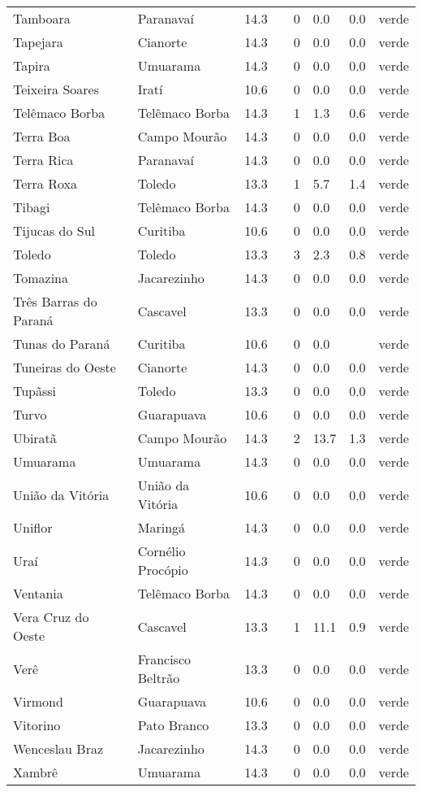 \begin{longtable}{l|lllllll}
  Tamboara & Paranavaí & 14.3 &  & 0 & 0.0 & 0.0 & verde \\ 
  Tapejara & Cianorte & 14.3 &  & 0 & 0.0 & 0.0 & verde \\ 
  Tapira & Umuarama & 14.3 &  & 0 & 0.0 & 0.0 & verde \\ 
  Teixeira Soares & Iratí & 10.6 &  & 0 & 0.0 & 0.0 & verde \\ 
  Telêmaco Borba & Telêmaco Borba & 14.3 &  & 1 & 1.3 & 0.6 & verde \\ 
  Terra Boa & Campo Mourão & 14.3 &  & 0 & 0.0 & 0.0 & verde \\ 
  Terra Rica & Paranavaí & 14.3 &  & 0 & 0.0 & 0.0 & verde \\ 
  Terra Roxa & Toledo & 13.3 &  & 1 & 5.7 & 1.4 & verde \\ 
  Tibagi & Telêmaco Borba & 14.3 &  & 0 & 0.0 & 0.0 & verde \\ 
  Tijucas do Sul & Curitiba & 10.6 &  & 0 & 0.0 & 0.0 & verde \\ 
  Toledo & Toledo & 13.3 &  & 3 & 2.3 & 0.8 & verde \\ 
  Tomazina & Jacarezinho & 14.3 &  & 0 & 0.0 & 0.0 & verde \\ 
  Três Barras do Paraná & Cascavel & 13.3 &  & 0 & 0.0 & 0.0 & verde \\ 
  Tunas do Paraná & Curitiba & 10.6 &  & 0 & 0.0 &  & verde \\ 
  Tuneiras do Oeste & Cianorte & 14.3 &  & 0 & 0.0 & 0.0 & verde \\ 
  Tupãssi & Toledo & 13.3 &  & 0 & 0.0 & 0.0 & verde \\ 
  Turvo & Guarapuava & 10.6 &  & 0 & 0.0 & 0.0 & verde \\ 
  Ubiratã & Campo Mourão & 14.3 &  & 2 & 13.7 & 1.3 & verde \\ 
  Umuarama & Umuarama & 14.3 &  & 0 & 0.0 & 0.0 & verde \\ 
  União da Vitória & União da Vitória & 10.6 &  & 0 & 0.0 & 0.0 & verde \\ 
  Uniflor & Maringá & 14.3 &  & 0 & 0.0 & 0.0 & verde \\ 
  Uraí & Cornélio Procópio & 14.3 &  & 0 & 0.0 & 0.0 & verde \\ 
  Ventania & Telêmaco Borba & 14.3 &  & 0 & 0.0 & 0.0 & verde \\ 
  Vera Cruz do Oeste & Cascavel & 13.3 &  & 1 & 11.1 & 0.9 & verde \\ 
  Verê & Francisco Beltrão & 13.3 &  & 0 & 0.0 & 0.0 & verde \\ 
  Virmond & Guarapuava & 10.6 &  & 0 & 0.0 & 0.0 & verde \\ 
  Vitorino & Pato Branco & 13.3 &  & 0 & 0.0 & 0.0 & verde \\ 
  Wenceslau Braz & Jacarezinho & 14.3 &  & 0 & 0.0 & 0.0 & verde \\ 
  Xambrê & Umuarama & 14.3 &  & 0 & 0.0 & 0.0 & verde \\ 
  \hline
\end{longtable}

